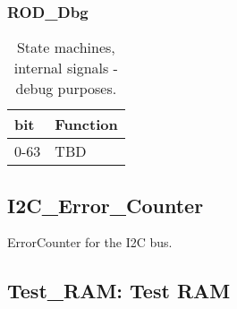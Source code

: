 \subsubsection{ROD\_Dbg}
\begin {table}[H]
\begin{center}
\begin{tabular}{|l|l|}
\hline
\textbf{bit} & \textbf{Function} \\
\hline
0-63 & TBD \\ \hline
\end{tabular}
\caption{State machines, internal signals - debug purposes.}
\end{center}
\end{table}


\subsection{I2C\_Error\_Counter}
ErrorCounter for the I2C bus.





\subsection{Test\_RAM: Test RAM}



